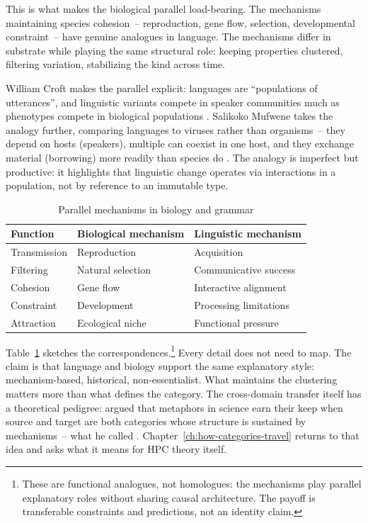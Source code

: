 This is what makes the biological parallel load-bearing. The mechanisms maintaining species cohesion~-- reproduction, gene flow, selection, developmental constraint~-- have genuine analogues in language. The mechanisms differ in substrate while playing the same structural role: keeping properties clustered, filtering variation, stabilizing the kind across time.

William Croft makes the parallel explicit: languages are \enquote{populations of utterances}, and linguistic variants compete in speaker communities much as phenotypes compete in biological populations \citep{croft2000}. Salikoko Mufwene takes the analogy further, comparing languages to viruses rather than organisms~-- they depend on hosts (speakers), multiple can coexist in one host, and they exchange material (borrowing) more readily than species do \citep{mufwene2001}. The analogy is imperfect but productive: it highlights that linguistic change operates via interactions in a population, not by reference to an immutable type.

\begin{table}[t]
\centering
\caption{Parallel mechanisms in biology and grammar}
\label{tab:parallel-mechanisms}
\begin{tabular}{@{}lll@{}}
\toprule
\textbf{Function} & \textbf{Biological mechanism} & \textbf{Linguistic mechanism} \\
\midrule
Transmission & Reproduction & Acquisition \\
Filtering & Natural selection & Communicative success \\
Cohesion & Gene flow & Interactive alignment \\
Constraint & Development & Processing limitations \\
Attraction & Ecological niche & Functional pressure \\
\bottomrule
\end{tabular}
\end{table}

Table~\ref{tab:parallel-mechanisms} sketches the correspondences.\footnote{These are functional analogues, not homologues: the mechanisms play parallel explanatory roles without sharing causal architecture. The payoff is transferable constraints and predictions, not an identity claim.} Every detail does not need to map. The claim is that language and biology support the same explanatory style: mechanism-based, historical, non-essentialist. What maintains the clustering matters more than what defines the category. The cross-domain transfer itself has a theoretical pedigree: \textcite{boyd1979} argued that metaphors in science earn their keep when source and target are both categories whose structure is sustained by mechanisms~-- what he called . Chapter~\ref{ch:how-categories-travel} returns to that idea and asks what it means for HPC theory itself.



